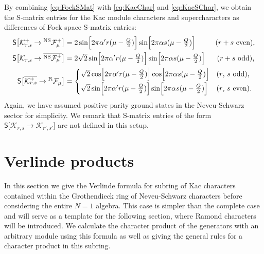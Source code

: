 \documentclass[a4paper,reqno,12pt]{report}
\theoremstyle{definition}
\numberwithin{equation}{section}
\let\originalleft\left     %
\let\originalright\right
\renewcommand{\left}{\mathopen{}\mathclose\bgroup\originalleft}
\renewcommand{\right}{\aftergroup\egroup\originalright}
\newcommand{\sqbrac}[1]{\left[ #1 \right]}
\newcommand{\ra}{\rightarrow}
\newcommand{\Kac}[1]{\mathcal{K}_{#1}}       %
\newcommand{\Fock}[1]{\mathcal{F}_{#1}}      %
\newcommand{\modS}{\mathsf{S}} %
\newcommand{\Smat}[2]{\modS \bigl[ #1 \ra #2 \bigr]}  %
\newcommand{\ns}{Neveu-Schwarz}
\newcommand{\ram}{Ramond}
\theoremstyle{plain}
\newcommand{\NSFock}[1]{{}^{\text{NS}}\Fock{#1}}   %
\newcommand{\RFock}[1]{{}^{\text{R}}\Fock{#1}}     %
\begin{document}
By combining \eqref{eq:FockSMat} with \eqref{eq:KacChar} and \eqref{eq:KacSChar}, we obtain the S-matrix entries for the Kac module characters and supercharacters as differences of Fock space S-matrix entries:
\begin{equation}
\begin{aligned}
\Smat{\Kac{r,s}^+}{\NSFock{\mu}^+} &= 2 \sin \sqbrac{2 \pi \alpha' r (\mu - \tfrac{Q}{2})} \sin \sqbrac{2 \pi \alpha s (\mu - \tfrac{Q}{2})} \mspace{50mu} \text{(\(r+s\) even),} \\
\Smat{\Kac{r,s}}{\overline{\NSFock{\mu}^+}} &= 2 \sqrt{2} \sin \sqbrac{2 \pi \alpha' r (\mu - \tfrac{Q}{2})} \sin \sqbrac{2 \pi \alpha s (\mu - \tfrac{Q}{2})} \mspace{30mu} \text{(\(r+s\) odd),} \\
\Smat{\overline{\Kac{r,s}^+}}{\RFock{\mu}} &=
\begin{cases}
\sqrt{2} \cos \sqbrac{2 \pi \alpha' r (\mu - \tfrac{Q}{2})} \cos \sqbrac{2 \pi \alpha s (\mu - \tfrac{Q}{2})} & \text{(\(r\), \(s\) odd),} \\[1ex]
\sqrt{2} \sin \sqbrac{2 \pi \alpha' r (\mu - \tfrac{Q}{2})} \sin \sqbrac{2 \pi \alpha s (\mu - \tfrac{Q}{2})} & \text{(\(r\), \(s\) even).}
\end{cases}
\end{aligned}
\end{equation}
Again, we have assumed positive parity ground states in the \ns{} sector for simplicity.  We remark that S-matrix entries of the form $\Smat{\Kac{r,s}}{\Kac{r',s'}}$ are not defined in this setup.

\section{Verlinde products} \label{sec:VerProd}

In this section we give the Verlinde formula for subring of Kac characters contained within the Grothendieck ring of  \ns{} characters before considering the entire $N=1$ algebra. This case is simpler than the complete case and will serve as a template for the following section, where \ram{} characters will be introduced. We calculate the character product of the generators with an arbitrary module using this formula as well as giving the general rules for a character product in this subring. 
\end{document}
